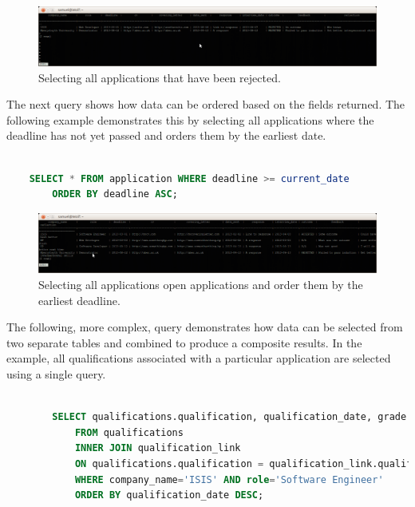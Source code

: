 \documentclass{article}
\begin{document}
\begin{figure}[H]
\centering
\includegraphics[width=1\textwidth]{img/test/test-rejected.png}
\caption{Selecting all applications that have been rejected.}
\label{fig:test-rejected}
\end{figure}

The next query shows how data can be ordered based on the fields returned. The following example demonstrates this by selecting all applications where the deadline has not yet passed and orders them by the earliest date.

\begin{center}
	\begin{lstlisting}[language=sql, showstringspaces=false]

	SELECT * FROM application WHERE deadline >= current_date 
		ORDER BY deadline ASC;

	\end{lstlisting}
\end{center}

\begin{figure}[H]
\centering
\includegraphics[width=1\textwidth]{img/test/test-earliest-date.png}
\caption{Selecting all applications open applications and order them by the earliest deadline.}
\label{fig:test-earliest-date}
\end{figure}

The following, more complex, query demonstrates how data can be selected from two separate tables and combined to produce a composite results. In the example, all qualifications associated with a particular application are selected using a single query.

\begin{center}
	\begin{lstlisting}[language=sql, showstringspaces=false]

		SELECT qualifications.qualification, qualification_date, grade 
			FROM qualifications 
			INNER JOIN qualification_link 
			ON qualifications.qualification = qualification_link.qualification]
			WHERE company_name='ISIS' AND role='Software Engineer'
			ORDER BY qualification_date DESC;

	\end{lstlisting}
\end{center}
\end{document}
